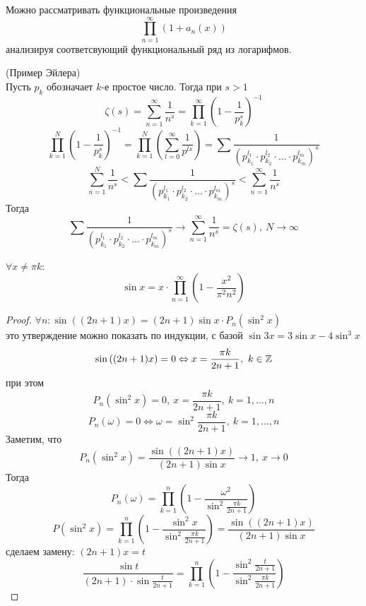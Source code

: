 \begin{comm}
    Можно рассматривать функциональные произведения
    \[\prod\limits_{n=1}^{\infty}(1+a_n(x))\]
    анализируя соответсвующий функциональный ряд из логарифмов.
\end{comm}
\begin{example} (Пример Эйлера)\\
    Пусть $p_k$ обозначает $k$-е простое число. Тогда при $s>1$ 
    \[\zeta(s)=\sum\limits_{n=1}^{\infty}\frac{1}{n^s}=\prod\limits_{k=1}^{\infty}(1-\frac{1}{p_k^s})^{-1}\]
    \[\prod\limits_{k=1}^{N}\left(1-\frac{1}{p_k^s}\right)^{-1}=\prod\limits_{k=1}^{N}\left(\sum\limits_{l=0}^{\infty}\frac{1}{p^{ls}}\right)=\sum\frac{1}{(p_{k_1}^{l_1}\cdot p_{k_2}^{l_2}\cdot \dots\cdot p_{k_m}^{l_m})^s}\]
    \[\sum\limits_{n=1}^{N}\frac{1}{n^s}<\sum\frac{1}{(p_{k_1}^{l_1}\cdot p_{k_2}^{l_2}\cdot \dots\cdot p_{k_m}^{l_m})^s}<\sum\limits_{n=1}^{\infty}\frac{1}{n^s}\]
    Тогда
    \[\sum\frac{1}{(p_{k_1}^{l_1}\cdot p_{k_2}^{l_2}\cdot \dots\cdot p_{k_m}^{l_m})^s} \to \sum\limits_{n=1}^{\infty}\frac{1}{n^s}=\zeta(s),\ N\to \infty\]
\end{example}
\begin{theorem}
    $\forall x\ne \pi k$:
    \[\sin{x}=x\cdot \prod\limits_{n=1}^{\infty}\left(1-\frac{x^2}{\pi^2 n^2}\right)\]
\end{theorem}
\begin{proof}
    $\forall n: \sin((2n+1)x)=(2n+1)\sin{x}\cdot P_n(\sin^2{x})$\\
    это утверждение можно показать по индукции, с базой $\sin{3x}=3\sin{x}-4\sin^3{x}$\\
    \[\sin{((2n+1)x)}=0 \Leftrightarrow x=\frac{\pi k}{2n+1},\ k\in \mathbb{Z}\]
    при этом
    \[P_n(\sin^2{x})=0,\ x=\frac{\pi k}{2n+1},\ k=1,\dots,n\]
    \[P_n(\omega)=0 \Leftrightarrow \omega=\sin^2{\frac{\pi k}{2n+1}},\ k=1,\dots, n\]
    Заметим, что
    \[P_n(\sin^2{x})=\frac{\sin((2n+1)x)}{(2n+1)\sin{x}}\to 1,\ x\to 0\]
    Тогда
    \[P_n(\omega)=\prod\limits_{k=1}^{n}(1-\frac{\omega^2}{\sin^2{\frac{\pi k}{2n+1}}})\]
    \[P(\sin^2{x})=\prod\limits_{k=1}^{n}\left(1-\frac{\sin^2{x}}{\sin^2{\frac{\pi k}{2n+1}}}\right)=\frac{\sin((2n+1)x)}{(2n+1)\sin{x}}\]
    сделаем замену: $(2n+1)x=t$
    \[\frac{\sin{t}}{(2n+1)\cdot \sin{\frac{t}{2n+1}}}=\prod\limits_{k=1}^{n}\left(1-\frac{\sin^2{\frac{t}{2n+1}}}{\sin^2{\frac{\pi k}{2n+1}}}\right)\]
\end{proof}